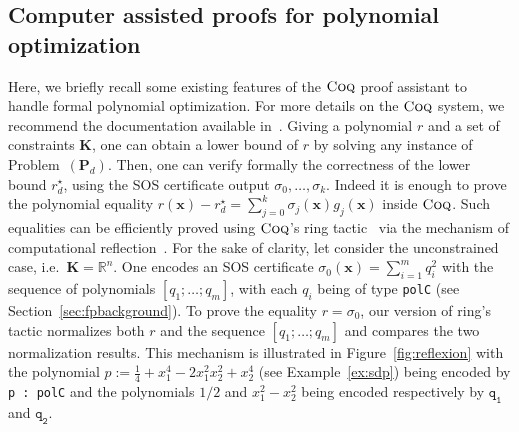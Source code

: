 \documentclass[preprint]{sigplanconf}
\newcommand{\code}[1]{\lstinline{#1}}
\newcommand{\R}{\mathbb{R}}
\newcommand{\x}{\mathbf{x}}
\def\P{\mathbf{P}}
\def\K{\mathbf{K}}
\newcommand{\coq}{\text{\sc Coq}}
\theoremstyle{plain}
\begin{document}
\subsection{Computer assisted proofs for polynomial optimization}
\label{sec:coqbackground}
Here, we briefly recall some existing features of the $\coq$ proof assistant to handle formal polynomial optimization.
For more details on the $\coq$ system, we recommend the
documentation available in~\cite{bertot2004interactive}.
Giving a polynomial $r$ and a set of constraints $\K$, one can obtain a lower bound of $r$ by solving any instance of Problem~$(\P_d)$. Then, one can verify formally the correctness of the lower bound $r_d^\star$, using the SOS certificate output $\sigma_0, \dots, \sigma_k$. Indeed it is enough to prove the polynomial equality $r(\x) - r_d^\star = \sum_{j=0}^k \sigma_j(\x) g_j(\x)$ inside $\coq$. Such equalities can be efficiently proved using $\coq$'s ring tactic~\cite{ring05} via the mechanism of computational reflection~\cite{Boutin97usingreflection}.
For the sake of clarity, let consider the unconstrained case, i.e.~$\K = \R^n$. One encodes an SOS certificate $\sigma_0(\x) = \sum_{i=1}^m q_i^2$  with the sequence of polynomials $[q_1; \dots; q_m]$, with each $q_i$ being of type \code{polC} (see Section~\ref{sec:fpbackground}). To prove the equality $r = \sigma_0$, our version of ring's tactic normalizes both $r$ and the sequence $[q_1; \dots; q_m]$ and compares the two normalization results. This mechanism is illustrated in Figure~\ref{fig:reflexion} with the polynomial $p := \frac{1}{4} + x_1^4 - 2 x_1^2 x_2^2 + x_2^4$ (see Example~\ref{ex:sdp}) being encoded by \code{p : polC}  and the polynomials $1/2$ and $x_1^2 - x_2^2$ being encoded respectively by $\mathtt{q_1}$ and $\mathtt{q_2}$. 
\end{document}
